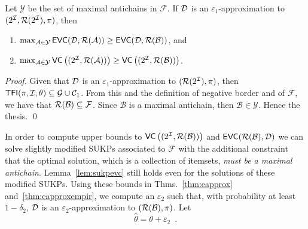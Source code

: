 \begin{lemma}\label{lem:antichains}
  Let $\mathcal{Y}$ be the set of maximal antichains in $\mathcal{F}$. If
  ${\cal D}$ is an $\varepsilon_1$-approximation to $(2^{\cal I},\mathcal{R}(2^{\cal I}),\pi)$, then
  \begin{enumerate}
    \item
      $\max_{\mathcal{A}\in\mathcal{Y}}\mathsf{EVC}({\cal D},\mathcal{R}(\mathcal{A}))\ge\mathsf{EVC}({\cal D},\mathcal{R}(\mathcal{B}))$,
      and
    \item
      $\max_{\mathcal{A}\in\mathcal{Y}}\mathsf{VC}\left((2^{\cal I},\mathcal{R}(\mathcal{A}))\right)\ge\mathsf{VC}\left((2^{\cal I},\mathcal{R}(\mathcal{B}))\right)$.
  \end{enumerate}
\end{lemma}
\ifarxiv
\begin{proof}
  Given %
  that ${\cal D}$ is an $\varepsilon_1$-approximation to $(\mathcal{R}(2^{\cal I}),\pi)$, %
  then %
  $\mathsf{TFI}(\pi,{\cal I},\theta)\subseteq\mathcal{G}\cup\mathcal{C}_1$. From this and
  the definition of negative border and of $\mathcal{F}$, we have that
  $\mathcal{R}(\mathcal{B})\subseteq\mathcal{F}$. Since $\mathcal{B}$ is a maximal
  antichain, then $\mathcal{B}\in\mathcal{Y}$. Hence the thesis.
  \qed
\end{proof}
\fi

In order to compute upper bounds to
$\mathsf{VC}\left((2^{\cal I},\mathcal{R}(\mathcal{B}))\right)$ and
$\mathsf{EVC}(\mathcal{R}(\mathcal{B}),{\cal D})$ we can solve slightly modified SUKPs 
associated to $\mathcal{F}$ with the additional constraint that the
optimal solution, which is a collection of itemsets, \emph{must be a maximal
antichain}. Lemma~\ref{lem:sukpevc} still holds even for the solutions of these
modified SUKPs. Using these bounds in Thms.~\ref{thm:eapprox}
and~\ref{thm:eapproxempir}, we compute an $\varepsilon_2$ such that, with
probability at least $1-\delta_2$, ${\cal D}$ is an $\varepsilon_2$-approximation to
$(\mathcal{R}(\mathcal{B}),\pi)$. Let 
\[
\hat{\theta}=\theta+\varepsilon_2\enspace.\]


